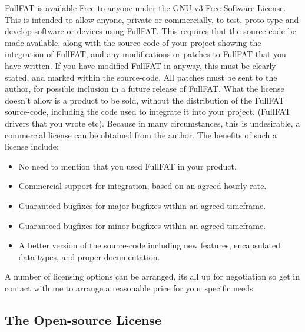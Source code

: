 FullFAT is available Free to anyone under the GNU v3 Free Software License. This is intended to allow anyone, private or commercially, to test, proto-type and develop software or devices using FullFAT. This requires that the source-code be made available, along with the source-code of your project showing the integration of FullFAT, and any modifications or patches to FullFAT that you have written.
If you have modified FullFAT in anyway, this must be clearly stated, and marked within the source-code. All patches must be sent to the author, for possible inclusion in a future release of FullFAT.
\newline
\newline
What the license doesn't allow is a product to be sold, without the distribution of the FullFAT source-code, including the code used to integrate it into your project. (FullFAT drivers that you wrote etc).
\newline
\newline
Because in many circumstances, this is undesirable, a commercial license can be obtained from the author. The benefits of such a license include:
\begin{itemize}
\item No need to mention that you used FullFAT in your product.
\item Commercial support for integration, based on an agreed hourly rate.
\item Guaranteed bugfixes for major bugfixes within an agreed timeframe.
\item Guaranteed bugfixes for minor bugfixes within an agreed timeframe.
\item A better version of the source-code including new features, encapsulated data-types, and proper documentation.
\end{itemize}

A number of licensing options can be arranged, its all up for negotiation so get in contact with me to arrange a reasonable price for your specific needs.
\newpage
\subsection{The Open-source License}
\scriptsize

